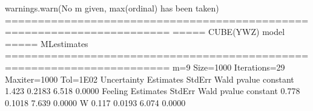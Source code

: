 \documentclass[letterpaper,10pt,english]{sphinxmanual}
\begin{document}
\begin{sphinxVerbatim}[commandchars=\\\{\}]
warnings.warn(\PYGZdq{}No m given, max(ordinal) has been taken\PYGZdq{})
=======================================================================
=====\PYGZgt{}\PYGZgt{}\PYGZgt{} CUBE(YWZ) model \PYGZlt{}\PYGZlt{}\PYGZlt{}===== ML\PYGZhy{}estimates
=======================================================================
m=9  Size=1000  Iterations=29  Maxiter=1000  Tol=1E\PYGZhy{}02
\PYGZhy{}\PYGZhy{}\PYGZhy{}\PYGZhy{}\PYGZhy{}\PYGZhy{}\PYGZhy{}\PYGZhy{}\PYGZhy{}\PYGZhy{}\PYGZhy{}\PYGZhy{}\PYGZhy{}\PYGZhy{}\PYGZhy{}\PYGZhy{}\PYGZhy{}\PYGZhy{}\PYGZhy{}\PYGZhy{}\PYGZhy{}\PYGZhy{}\PYGZhy{}\PYGZhy{}\PYGZhy{}\PYGZhy{}\PYGZhy{}\PYGZhy{}\PYGZhy{}\PYGZhy{}\PYGZhy{}\PYGZhy{}\PYGZhy{}\PYGZhy{}\PYGZhy{}\PYGZhy{}\PYGZhy{}\PYGZhy{}\PYGZhy{}\PYGZhy{}\PYGZhy{}\PYGZhy{}\PYGZhy{}\PYGZhy{}\PYGZhy{}\PYGZhy{}\PYGZhy{}\PYGZhy{}\PYGZhy{}\PYGZhy{}\PYGZhy{}\PYGZhy{}\PYGZhy{}\PYGZhy{}\PYGZhy{}\PYGZhy{}\PYGZhy{}\PYGZhy{}\PYGZhy{}\PYGZhy{}\PYGZhy{}\PYGZhy{}\PYGZhy{}\PYGZhy{}\PYGZhy{}\PYGZhy{}\PYGZhy{}\PYGZhy{}\PYGZhy{}\PYGZhy{}\PYGZhy{}
Uncertainty
          Estimates  StdErr     Wald  p\PYGZhy{}value
constant      1.423  0.2183    6.518   0.0000
\PYGZhy{}\PYGZhy{}\PYGZhy{}\PYGZhy{}\PYGZhy{}\PYGZhy{}\PYGZhy{}\PYGZhy{}\PYGZhy{}\PYGZhy{}\PYGZhy{}\PYGZhy{}\PYGZhy{}\PYGZhy{}\PYGZhy{}\PYGZhy{}\PYGZhy{}\PYGZhy{}\PYGZhy{}\PYGZhy{}\PYGZhy{}\PYGZhy{}\PYGZhy{}\PYGZhy{}\PYGZhy{}\PYGZhy{}\PYGZhy{}\PYGZhy{}\PYGZhy{}\PYGZhy{}\PYGZhy{}\PYGZhy{}\PYGZhy{}\PYGZhy{}\PYGZhy{}\PYGZhy{}\PYGZhy{}\PYGZhy{}\PYGZhy{}\PYGZhy{}\PYGZhy{}\PYGZhy{}\PYGZhy{}\PYGZhy{}\PYGZhy{}\PYGZhy{}\PYGZhy{}\PYGZhy{}\PYGZhy{}\PYGZhy{}\PYGZhy{}\PYGZhy{}\PYGZhy{}\PYGZhy{}\PYGZhy{}\PYGZhy{}\PYGZhy{}\PYGZhy{}\PYGZhy{}\PYGZhy{}\PYGZhy{}\PYGZhy{}\PYGZhy{}\PYGZhy{}\PYGZhy{}\PYGZhy{}\PYGZhy{}\PYGZhy{}\PYGZhy{}\PYGZhy{}\PYGZhy{}
Feeling
          Estimates  StdErr     Wald  p\PYGZhy{}value
constant     \PYGZhy{}0.778  0.1018   \PYGZhy{}7.639   0.0000
W            \PYGZhy{}0.117  0.0193   \PYGZhy{}6.074   0.0000
\PYGZhy{}\PYGZhy{}\PYGZhy{}\PYGZhy{}\PYGZhy{}\PYGZhy{}\PYGZhy{}\PYGZhy{}\PYGZhy{}\PYGZhy{}\PYGZhy{}\PYGZhy{}\PYGZhy{}\PYGZhy{}\PYGZhy{}\PYGZhy{}\PYGZhy{}\PYGZhy{}\PYGZhy{}\PYGZhy{}\PYGZhy{}\PYGZhy{}\PYGZhy{}\PYGZhy{}\PYGZhy{}\PYGZhy{}\PYGZhy{}\PYGZhy{}\PYGZhy{}\PYGZhy{}\PYGZhy{}\PYGZhy{}\PYGZhy{}\PYGZhy{}\PYGZhy{}\PYGZhy{}\PYGZhy{}\PYGZhy{}\PYGZhy{}\PYGZhy{}\PYGZhy{}\PYGZhy{}\PYGZhy{}\PYGZhy{}\PYGZhy{}\PYGZhy{}\PYGZhy{}\PYGZhy{}\PYGZhy{}\PYGZhy{}\PYGZhy{}\PYGZhy{}\PYGZhy{}\PYGZhy{}\PYGZhy{}\PYGZhy{}\PYGZhy{}\PYGZhy{}\PYGZhy{}\PYGZhy{}\PYGZhy{}\PYGZhy{}\PYGZhy{}\PYGZhy{}\PYGZhy{}\PYGZhy{}\PYGZhy{}\PYGZhy{}\PYGZhy{}\PYGZhy{}\PYGZhy{}

\end{sphinxVerbatim}
\end{document}

